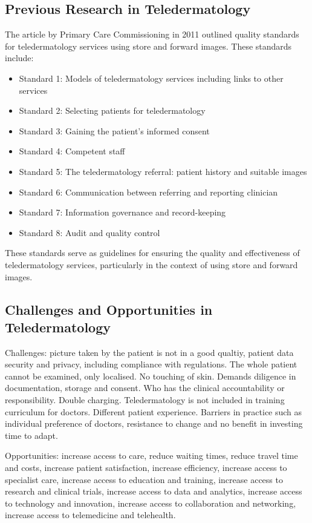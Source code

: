 \subsection{Previous Research in Teledermatology}
\label{sub:PreviousResearchTeledermatology}
The article by Primary Care Commissioning in 2011 outlined quality standards for teledermatology services using store and forward images. These standards include: \par
\noindent
\begin{itemize}
    \item Standard 1: Models of teledermatology services including links to other services
    \item Standard 2: Selecting patients for teledermatology
    \item Standard 3: Gaining the patient's informed consent
    \item Standard 4: Competent staff
    \item Standard 5: The teledermatology referral: patient history and suitable images
    \item Standard 6: Communication between referring and reporting clinician
    \item Standard 7: Information governance and record-keeping
    \item Standard 8: Audit and quality control
\end{itemize}
\par
\noindent
These standards serve as guidelines for ensuring the quality and effectiveness of teledermatology services, particularly in the context of using store and forward images.


\subsection{Challenges and Opportunities in Teledermatology}
\label{sub:ChallengesOpportunitiesTeledermatology}
Challenges: picture taken by the patient is not in a good qualtiy, patient data security and privacy, including compliance with regulations. The whole patient cannot be examined, only localised. No touching of skin. Demands diligence in documentation, storage and consent. Who has the clinical accountability or responsibility. Double charging. Teledermatology is not included in training curriculum for doctors. Different patient experience. Barriers in practice such as individual preference of doctors, resistance to change and no benefit in investing time to adapt. \par
\vspace{\baselineskip}
\noindent
Opportunities: increase access to care, reduce waiting times, reduce travel time and costs, increase patient satisfaction, increase efficiency, increase access to specialist care, increase access to education and training, increase access to research and clinical trials, increase access to data and analytics, increase access to technology and innovation, increase access to collaboration and networking, increase access to telemedicine and telehealth. \par